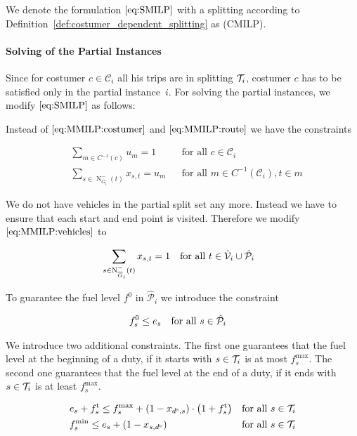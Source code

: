 We denote the formulation $\eqref{eq:SMILP}$ with a splitting according to Definition~\ref{def:costumer_dependent_splitting} as (CMILP).

\paragraph{Solving of the Partial Instances} \parfill

Since for costumer $c\in\mathcal{C}_i$ all his trips are in splitting $\mathcal{T}_i$, costumer $c$ has to be satisfied only in the partial instance~$i$. For solving the partial instances, we modify $\eqref{eq:SMILP}$ as follows:

Instead of $\eqref{eq:MMILP:costumer}$ and $\eqref{eq:MMILP:route}$ we have the constraints

\begin{align}
	& \sum_{m\in C^{-1}(c)} u_m = 1 && \text{for all } c\in\mathcal{C}_i \label{eq:CMILP:costumer} \\
	&\sum_{s\in\operatorname{N}_{\overline{G}_i}^-(t)} x_{s,t} = u_m && \text{for all } m\in C^{-1}\left(\mathcal{C}_i\right), t\in m \label{eq:CMILP:route}
\end{align}

We do not have vehicles in the partial split set any more. Instead we have to ensure that each start and end point is visited. Therefore we modify $\eqref{eq:MMILP:vehicles}$ to 

\begin{align}
	& \sum_{s\in\operatorname{N}_{\overline{G}_i}^-(t)} x_{s,t} = 1 && \text{for all } t\in\hat{\mathcal{V}}_i\cup\hat{\mathcal{P}}_i \label{eq:CMILP:start_end_points}
\end{align}

To guarantee the fuel level $f^0$ in $\hat{\mathcal{P}}_i$ we introduce the constraint

\begin{align}
	& f^0_s \leq e_s && \text{for all } s\in\hat{\mathcal{P}}_i \label{eq:CMILP:final_fuel}
\end{align}

We introduce two additional constraints. The first one guarantees that the fuel level at the beginning of a duty, if it starts with $s\in\mathcal{T}_i$ is at most $f_s^{\max}$. The second one guarantees that the fuel level at the end of a duty, if it ends with $s\in\mathcal{T}_i$ is at least $f_s^{\max}$.

\begin{align}
	& e_s + f^{\operatorname{t}}_s \leq f^{\max}_s + \left(1-x_{d^{\operatorname{s}},s}\right)\cdot\left(1+f^{\operatorname{t}}_s\right) && \text{for all } s\in\mathcal{T}_i \label{eq:CMILP:fmax} \\
	& f^{\min}_s \leq e_s + \left(1-x_{s,d^{\operatorname{e}}}\right) && \text{for all } s\in\mathcal{T}_i \label{eq:CMILP:fmin}
\end{align}

